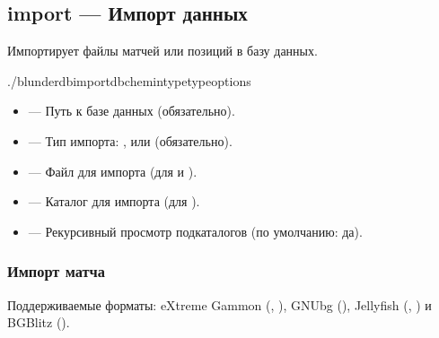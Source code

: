 \documentclass[letterpaper,10pt,russian]{sphinxmanual}
\begin{document}
\subsection{import — Импорт данных}
\label{\detokenize{cli:import-importer-des-donnees}}
\sphinxAtStartPar
Импортирует файлы матчей или позиций в базу данных.

\begin{sphinxVerbatim}[commandchars=\\\{\}]
./blunderdbimport\PYGZhy{}\PYGZhy{}db\PYGZlt{}chemin\PYGZgt{}\PYGZhy{}\PYGZhy{}type\PYGZlt{}type\PYGZgt{}\PYG{o}{[}options\PYG{o}{]}
\end{sphinxVerbatim}

\sphinxAtStartPar
{}
\begin{itemize}
\item {} 
\sphinxAtStartPar
{} — Путь к базе данных (обязательно).

\item {} 
\sphinxAtStartPar
{} — Тип импорта: ,  или  (обязательно).

\item {} 
\sphinxAtStartPar
{} — Файл для импорта (для  и ).

\item {} 
\sphinxAtStartPar
{} — Каталог для импорта (для ).

\item {} 
\sphinxAtStartPar
{} — Рекурсивный просмотр подкаталогов (по умолчанию: да).

\end{itemize}


\subsubsection{Импорт матча}
\label{\detokenize{cli:import-d-un-match}}
\sphinxAtStartPar
Поддерживаемые форматы: eXtreme Gammon (, ), GNUbg (), Jellyfish (, ) и BGBlitz ().
\end{document}
